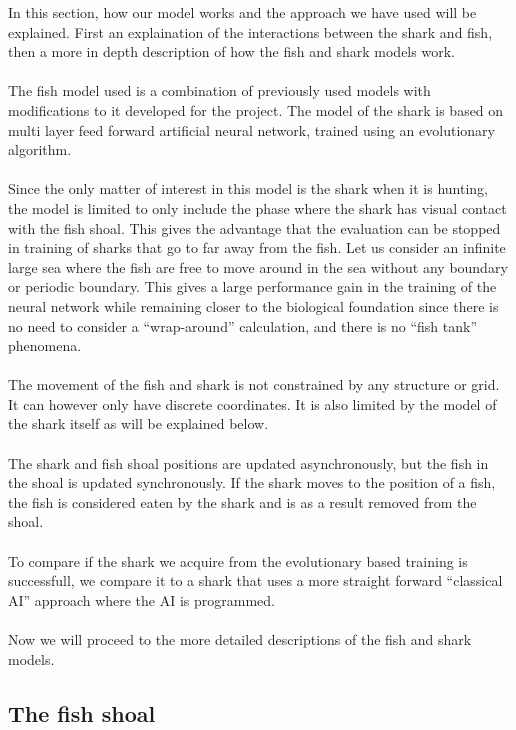 In this section, how our model works and the approach we have
used will be explained. First an explaination of the interactions between the
shark and fish, then a more in depth description of how the fish
and shark models work.\\
\\
The fish model used is a combination of previously used models with
modifications to it developed for the project. The model of the
shark is based on multi layer feed forward artificial neural network, trained
using an evolutionary algorithm.\\
\\
Since the only matter of interest in this model is the shark when
it is hunting, the model is limited to only include the phase where the
shark has visual contact with the fish shoal. This gives the advantage that the
evaluation can be stopped in training of sharks that go to far away from the
fish. Let us consider an infinite large sea where the fish are free to move
around in the sea without any boundary or periodic boundary. This gives a large
performance gain in the training of the neural network while remaining
closer to the biological foundation since there is no need to consider a
``wrap-around'' calculation, and there is no ``fish tank'' phenomena.\\
\\
The movement of the fish and shark is not constrained by any structure or grid.
It can however only have discrete coordinates. It is also limited by the model
of the shark itself as will be explained below.\\
\\
The shark and fish shoal positions are updated asynchronously, but the fish in
the shoal is updated synchronously. If the shark moves to the position of a
fish, the fish is considered eaten by the shark and is as a result removed from
the shoal.\\
\\
To compare if the shark we acquire from the evolutionary based training is
successfull, we compare it to a shark that uses a more straight forward
``classical AI'' approach where the AI is programmed.\\
\\
Now we will proceed to the more detailed descriptions of the fish and shark
models.

\subsection{The fish shoal}

